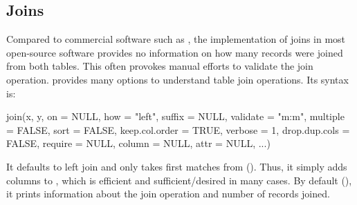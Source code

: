 \documentclass[article]{jss} %
\newcommand{\fct}[1]{\code{#1()}}
\begin{document}
\subsection{Joins}
%
Compared to commercial software such as  \citep{STATA}, the implementation of joins in most open-source software provides no information on how many records were joined from both tables. This often provokes manual efforts to validate the join operation. \fct{collapse::join} provides many options to understand table join operations. Its syntax is:
\begin{Code}
join(x, y, on = NULL, how = "left", suffix = NULL, validate = "m:m",
  multiple = FALSE, sort = FALSE, keep.col.order = TRUE, verbose = 1,
  drop.dup.cols = FALSE, require = NULL, column = NULL, attr = NULL, ...)
\end{Code}
It defaults to left join and only takes first matches from  (). Thus, it simply adds columns to , which is efficient and sufficient/desired in many cases. By default (), it prints information about the join operation and number of records joined. \newline
\end{document}
